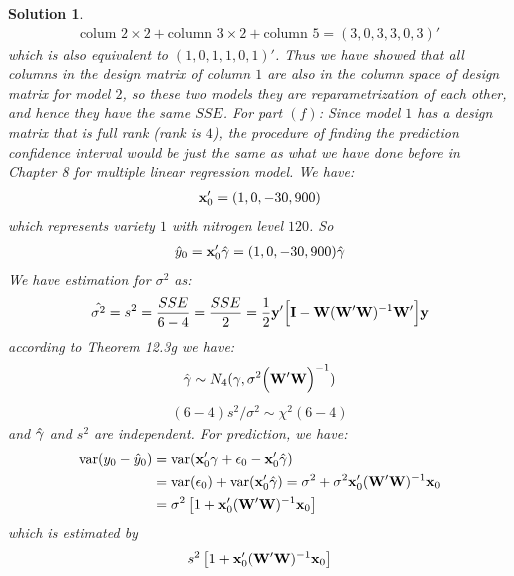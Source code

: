 \documentclass[11pt]{article}
\newtheorem{sol}{Solution}
\begin{document}
\begin{sol}
  \begin{align*}
  	\text{colum }2 \times 2 + \text{column }3 \times 2 + \text{column 5} = (3, 0, 3, 3, 0, 3)'
  \end{align*} 
  which is also equivalent to $(1,0, 1, 1, 0, 1)'$.\vskip 2mm
  Thus we have showed that all columns in the design matrix of column $1$ are also in the column space of design matrix for model $2$, so these two models they are reparametrization of each other, and hence they have the same $SSE$.\vskip 2mm
  For part $(f)$:\vskip 2mm
  Since model $1$ has a design matrix that is full rank (rank is $4$), the procedure of finding the prediction confidence interval would be just the same as what we have done before in Chapter 8 for multiple linear regression model.\vskip 2mm
  We have:
  \begin{align*}
  	{\bf x}_0' = (1, 0,  -30, 900)
  \end{align*}
  which represents variety $1$ with nitrogen level $120$.\vskip 2mm
  So
  \begin{align*}
	\hat{y}_0 = {\bf x}_0' \hat{{\bf \gamma}} = (1, 0, -30, 900)\hat{{\bf \gamma}}
  \end{align*}
  We have estimation for $\sigma^2$ as:
  \begin{align*}
  	\hat{\sigma^2} = s^2 = \frac{SSE}{6 - 4} = \frac{SSE}{2} = \frac{1}{2}{\bf y}'\Big[{\bf I} - {\bf W}({\bf W}'{\bf W})^{-1}{\bf W}'\Big]{\bf y}
  \end{align*}
  according to Theorem 12.3g we have:
  \begin{align*}
  	\hat{{\bf \gamma}} \sim N_4(\gamma, \sigma^2\Big({\bf W}'{\bf W}\Big)^{-1})
  \end{align*}
  \begin{align*}
  	(6 - 4)s^2/\sigma^2 \sim \chi^2(6 - 4)
  \end{align*}
  and $\hat{\bf \gamma}$ and $s^2$ are independent.\vskip 2mm
  For prediction, we have:
  \begin{align*}
  	\text{var}(y_0 - \hat{y}_0) &= \text{var}({\bf x}'_0{\bf \gamma} + \epsilon_0 - {\bf x}'_0\hat{{\bf \gamma}})\\
  	&= \text{var}(\epsilon_0) + \text{var}({\bf x}'_0\hat{{\bf \gamma}}) = \sigma^2 + \sigma^2{\bf x}_0'({\bf W}'{\bf W})^{-1}{\bf x}_0\\
  	&= \sigma^2\left[1 + {\bf x}_0'({\bf W}'{\bf W})^{-1}{\bf x}_0 \right]
  \end{align*}
  which is estimated by 
  \begin{align*}
  	s^2\left[1 + {\bf x}_0'({\bf W}'{\bf W})^{-1}{\bf x}_0 \right]

\end{align*}
\end{sol}
\end{document}
